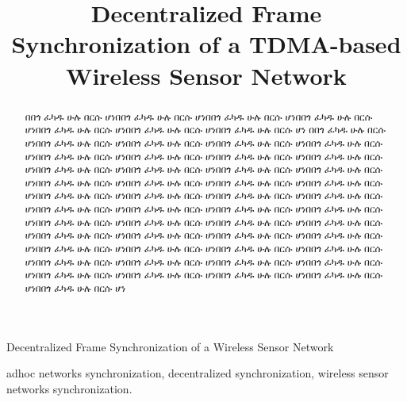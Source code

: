 \documentclass[journal]{IEEEtran}
\begin{document}
\title{Decentralized Frame Synchronization of a TDMA-based Wireless Sensor Network}

\author{\IEEEauthorblockN{}
}

{Decentralized Frame Synchronization of a Wireless Sensor Network}

\maketitle

\begin{abstract}
በበጎ ፈካዱ ሁሉ በርሱ ሆነበበጎ ፈካዱ ሁሉ በርሱ ሆነበበጎ ፈካዱ ሁሉ በርሱ ሆነበበጎ ፈካዱ ሁሉ በርሱ ሆነበበጎ ፈካዱ ሁሉ በርሱ ሆነበበጎ ፈካዱ ሁሉ በርሱ ሆነበበጎ ፈካዱ ሁሉ በርሱ ሆነ
በበጎ ፈካዱ ሁሉ በርሱ ሆነበበጎ ፈካዱ ሁሉ በርሱ ሆነበበጎ ፈካዱ ሁሉ በርሱ ሆነበበጎ ፈካዱ ሁሉ በርሱ ሆነበበጎ ፈካዱ ሁሉ በርሱ ሆነበበጎ ፈካዱ ሁሉ በርሱ ሆነበበጎ ፈካዱ ሁሉ በርሱ ሆነበበጎ ፈካዱ ሁሉ በርሱ ሆነበበጎ ፈካዱ ሁሉ በርሱ ሆነበበጎ ፈካዱ ሁሉ በርሱ ሆነበበጎ ፈካዱ ሁሉ በርሱ ሆነበበጎ ፈካዱ ሁሉ በርሱ ሆነበበጎ ፈካዱ ሁሉ በርሱ ሆነበበጎ ፈካዱ ሁሉ በርሱ ሆነበበጎ ፈካዱ ሁሉ በርሱ ሆነበበጎ ፈካዱ ሁሉ በርሱ ሆነበበጎ ፈካዱ ሁሉ በርሱ ሆነበበጎ ፈካዱ ሁሉ በርሱ ሆነበበጎ ፈካዱ ሁሉ በርሱ ሆነበበጎ ፈካዱ ሁሉ በርሱ ሆነበበጎ ፈካዱ ሁሉ በርሱ ሆነበበጎ ፈካዱ ሁሉ በርሱ ሆነበበጎ ፈካዱ ሁሉ በርሱ ሆነበበጎ ፈካዱ ሁሉ በርሱ ሆነበበጎ ፈካዱ ሁሉ በርሱ ሆነበበጎ ፈካዱ ሁሉ በርሱ ሆነበበጎ ፈካዱ ሁሉ በርሱ ሆነበበጎ ፈካዱ ሁሉ በርሱ ሆነበበጎ ፈካዱ ሁሉ በርሱ ሆነበበጎ ፈካዱ ሁሉ በርሱ ሆነበበጎ ፈካዱ ሁሉ በርሱ ሆነበበጎ ፈካዱ ሁሉ በርሱ ሆነበበጎ ፈካዱ ሁሉ በርሱ ሆነበበጎ ፈካዱ ሁሉ በርሱ ሆነበበጎ ፈካዱ ሁሉ በርሱ ሆነበበጎ ፈካዱ ሁሉ በርሱ ሆነበበጎ ፈካዱ ሁሉ በርሱ ሆነበበጎ ፈካዱ ሁሉ በርሱ ሆነበበጎ ፈካዱ ሁሉ በርሱ ሆነበበጎ ፈካዱ ሁሉ በርሱ ሆነበበጎ ፈካዱ ሁሉ በርሱ ሆነበበጎ ፈካዱ ሁሉ በርሱ ሆነበበጎ ፈካዱ ሁሉ በርሱ ሆነበበጎ ፈካዱ ሁሉ በርሱ ሆነበበጎ ፈካዱ ሁሉ በርሱ ሆነበበጎ ፈካዱ ሁሉ በርሱ ሆነ
\end{abstract}
\begin{IEEEkeywords}
adhoc networks synchronization, decentralized synchronization, wireless sensor networks synchronization.
\end{IEEEkeywords}
\end{document}

